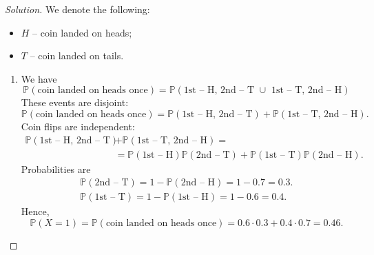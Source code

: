 \documentclass{article}[12pt]
\newenvironment{solution}
  {\renewcommand\qedsymbol{$\blacksquare$}\begin{proof}[Solution]}
  {\end{proof}}
\renewcommand{\P}{\mathbb{P}}
\begin{document}
\begin{solution}
We denote the following:
\begin{itemize}
    \item $H$ -- coin landed on heads;
    \item $T$ -- coin landed on tails.
\end{itemize}
\begin{enumerate}[label=(\alph*)]
    \item We have
    \begin{equation*}
        \P(\text{coin landed on heads once}) = \P(\text{1st -- H, 2nd -- T $\cup$ 1st -- T, 2nd -- H})
    \end{equation*}
    These events are disjoint:
    \begin{equation*}
        \P(\text{coin landed on heads once}) = \P(\text{1st -- H, 2nd -- T}) + \P(\text{1st -- T, 2nd -- H}).
    \end{equation*}
    Coin flips are independent:
    \begin{align*}
        \P(\text{1st -- H, 2nd -- T}) &+ \P(\text{1st -- T, 2nd -- H}) = 
        \\
        &= \P(\text{1st -- H})\P(\text{2nd -- T}) + \P(\text{1st -- T})\P(\text{2nd -- H}).
    \end{align*}
    Probabilities are
    \begin{gather*}
        \P(\text{2nd -- T}) = 1 - \P(\text{2nd -- H}) = 1 - 0.7 = 0.3.
        \\
        \P(\text{1st -- T}) = 1 - \P(\text{1st -- H}) = 1 - 0.6 = 0.4.
    \end{gather*}
    Hence,
    \begin{equation*}
        \P(X = 1) = \P(\text{coin landed on heads once}) = 0.6\cdot 0.3 + 0.4 \cdot 0.7 = 0.46.
    \end{equation*}
    

\end{enumerate}
\end{solution}
\end{document}
